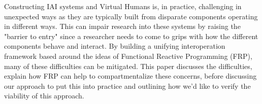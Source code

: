 
Constructing IAI systems and Virtual Humans is, in practice, challenging in unexpected ways as they are typically built from disparate components operating in different ways.
This can impair research into these systems by raising the "barrier to entry" since a researcher needs to come to grips with how the different components behave and interact.
By building a unifying interoperation framework based around the ideas of Functional Reactive Programming (FRP), many of these difficulties can be mitigated.
This paper discusses the difficulties, explain how FRP can help to compartmentalize these concerns, before discussing our approach to put this into practice and outlining how we'd like to verify the viability of this approach.
